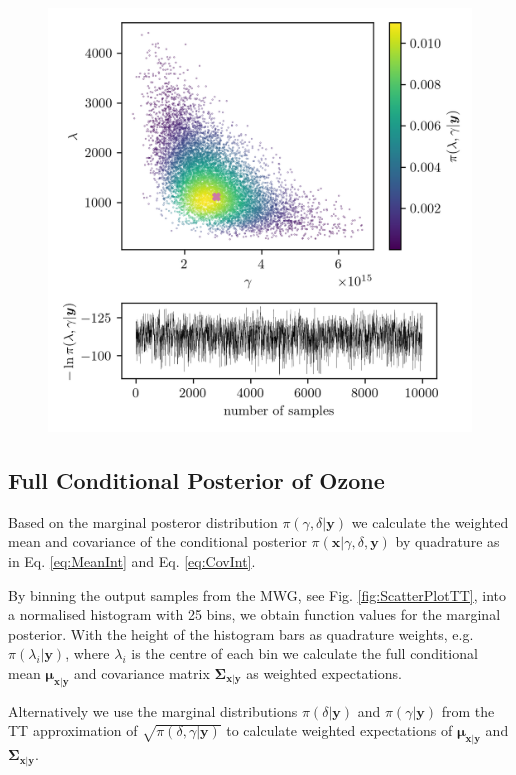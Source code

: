 \begin{figure}[ht!]
	\centering
	\includegraphics{ScatterplusHistoPlusTT.png}
	\caption[]{}
	\label{fig:UwerrMargFirst}
\end{figure}



\subsection{Full Conditional Posterior of Ozone}
\label{subsec:firstCond}
Based on the marginal posteror distribution $\pi(\gamma, \delta | \bm{y})$ we calculate the weighted mean and covariance of the conditional posterior $\pi(\bm{x} | \gamma, \delta, \bm{y})$ by quadrature as in Eq. \ref{eq:MeanInt} and Eq. \ref{eq:CovInt}.

By binning the output samples from the MWG, see Fig. \ref{fig:ScatterPlotTT}, into a normalised histogram with 25 bins, we obtain function values for the marginal posterior.
With the height of the histogram bars as quadrature weights, e.g. $\pi(\lambda_i| \bm{y})$, where $\lambda_i$ is the centre of each bin we calculate the full conditional mean $\bm{\mu}_{\bm{x}|\bm{y}}$ and covariance matrix $\bm{\Sigma}_{\bm{x}|\bm{y}}$ as weighted expectations.

Alternatively we use the marginal distributions $\pi(\delta | \bm{y})$ and $\pi(\gamma | \bm{y})$ from the TT approximation of $\sqrt{\pi(\delta, \gamma | \bm{y})}$ to calculate 
weighted expectations of $\bm{\mu}_{\bm{x}|\bm{y}}$ and $\bm{\Sigma}_{\bm{x}|\bm{y}}$.


